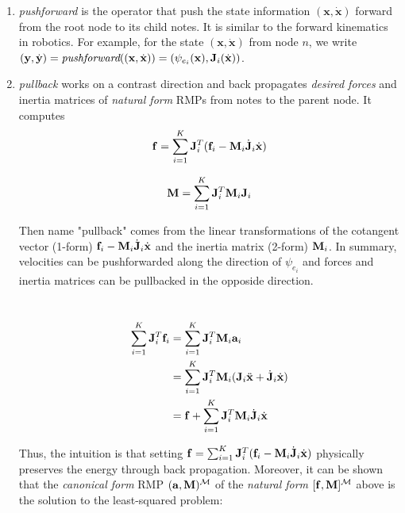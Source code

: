 \begin{enumerate}
\item \textit{pushforward} is the operator that push the state information $(\mathbf{x}, \dot{\mathbf{x}})$ forward from the root node to its child notes. It is similar to the forward kinematics in robotics. For example, for the state $(\mathbf{x}, \dot{\mathbf{x}})$ from node $n$, we write $(\mathbf{y},\dot{\mathbf{y}}) = \textit{pushforward}((\mathbf{x}, \dot{\mathbf{x}}))= (\psi_{e_i}(\mathbf{x}), \mathbf{J}_i(\dot{\mathbf{x}}))$.
\item \textit{pullback} works on a contrast direction and back propagates \textit{desired forces} and inertia matrices of \textit{natural form} RMPs from notes to the parent node. It computes
\begin{equation}
\mathbf{f} = \sum_{i=1}^{K}\mathbf{J}_i^T(\mathbf{f}_i - \mathbf{M}_i\dot{\mathbf{J}}_i\dot{\mathbf{x}})
\end{equation}

\begin{equation}
\mathbf{M} = \sum_{i=1}^{K}\mathbf{J}_i^T\mathbf{M}_i\mathbf{J}_i
\end{equation}

Then name "pullback" comes from the linear transformations of the cotangent vector (1-form) $\mathbf{f}_i-\mathbf{M}_i \dot{\mathbf{J}}_i\dot{\mathbf{x}}$ and the inertia matrix (2-form) $\mathbf{M}_i$. In summary, velocities can be pushforwarded along the direction of $\psi_{e_i}$ and forces and inertia matrices can be pullbacked in the opposide direction.

 \\

\begin{equation}
\begin{aligned}
\sum_{i=1}^{K}\mathbf{J}_i^T\mathbf{f}_i &= \sum_{i=1}^{K}\mathbf{J}_i^T\mathbf{M}_i\mathbf{a}_i \\
&= \sum_{i=1}^{K}\mathbf{J}_i^T\mathbf{M}_i(\mathbf{J}_i\ddot{\mathbf{x}}+\dot{\mathbf{J}}_i\dot{\mathbf{x}}) \\
&=\mathbf{f} + \sum_{i=1}^{K}\mathbf{J}_i^T\mathbf{M}_i\dot{\mathbf{J}}_i\dot{\mathbf{x}}
\end{aligned}
\end{equation}

Thus, the intuition is that setting $\mathbf{f} = \sum_{i=1}^{K} \mathbf{J}_i^T(\mathbf{f}_i - \mathbf{M}_i\dot{\mathbf{J}}_i\dot{\mathbf{x}})$ physically preserves the energy through back propagation. Moreover, it can be shown that the \textit{canonical form} RMP $(\mathbf{a}, \mathbf{M})^{\mathcal{M}}$ of the \textit{natural form} $[\mathbf{f}, \mathbf{M}]^{\mathcal{M}}$ above is the solution to the least-squared problem:


\end{enumerate}
